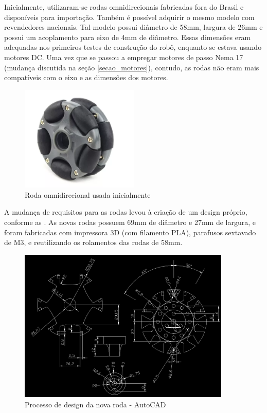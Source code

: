 Inicialmente, utilizaram-se rodas omnidirecionais fabricadas fora do Brasil e disponíveis para importação. Também é
possível adquirir o mesmo modelo com revendedores nacionais.
Tal modelo possui diâmetro de 58mm, largura de 26mm e possui um acoplamento para eixo de 4mm de diâmetro. Essas
dimensões eram adequadas nos primeiros testes de construção do robô, enquanto se estava usando motores DC. Uma vez que
se passou a empregar motores de passo Nema 17 (mudança discutida na seção \ref{secao_motores}), contudo, as rodas não eram
mais compatíveis com o eixo e as dimensões dos motores.

\begin{figure}[h]
	\centering
	\caption{Roda omnidirecional usada inicialmente}
	\includegraphics[width=0.5\textwidth]{figures/roda_china.png}	
\end{figure}

A mudança de requisitos para as rodas levou à criação de um design próprio, conforme as
.
As novas rodas possuem 69mm de diâmetro e 27mm de largura,
e foram fabricadas com impressora
3D (com filamento PLA), parafusos sextavado de M3, e reutilizando os rolamentos das rodas de 58mm.

\begin{figure}[h]
	\centering
	\caption{Processo de design da nova roda - AutoCAD}
	\label{new_wheel_cad_design}
	\includegraphics[width=0.9\textwidth]{figures/roda_processo_desing_passo1}
\end{figure}


